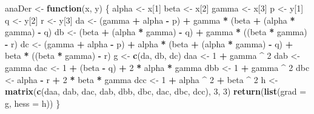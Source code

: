 \documentclass[
  12pt,
]{article}
\newenvironment{Shaded}{\begin{snugshade}}{\end{snugshade}}
\newcommand{\AttributeTok}[1]{\textcolor[rgb]{0.13,0.29,0.53}{#1}}
\newcommand{\ControlFlowTok}[1]{\textcolor[rgb]{0.13,0.29,0.53}{\textbf{#1}}}
\newcommand{\DecValTok}[1]{\textcolor[rgb]{0.00,0.00,0.81}{#1}}
\newcommand{\FunctionTok}[1]{\textcolor[rgb]{0.13,0.29,0.53}{\textbf{#1}}}
\newcommand{\NormalTok}[1]{#1}
\newcommand{\OtherTok}[1]{\textcolor[rgb]{0.56,0.35,0.01}{#1}}
\newcommand{\SpecialCharTok}[1]{\textcolor[rgb]{0.81,0.36,0.00}{\textbf{#1}}}
\begin{document}
\begin{Shaded}
\begin{Highlighting}[]
\NormalTok{anaDer }\OtherTok{\textless{}{-}} \ControlFlowTok{function}\NormalTok{(x, y) \{}
\NormalTok{  alpha }\OtherTok{\textless{}{-}}\NormalTok{ x[}\DecValTok{1}\NormalTok{]}
\NormalTok{  beta }\OtherTok{\textless{}{-}}\NormalTok{ x[}\DecValTok{2}\NormalTok{]}
\NormalTok{  gamma }\OtherTok{\textless{}{-}}\NormalTok{ x[}\DecValTok{3}\NormalTok{]}
\NormalTok{  p }\OtherTok{\textless{}{-}}\NormalTok{ y[}\DecValTok{1}\NormalTok{]}
\NormalTok{  q }\OtherTok{\textless{}{-}}\NormalTok{ y[}\DecValTok{2}\NormalTok{]}
\NormalTok{  r }\OtherTok{\textless{}{-}}\NormalTok{ y[}\DecValTok{3}\NormalTok{]}
\NormalTok{  da }\OtherTok{\textless{}{-}}\NormalTok{ (gamma }\SpecialCharTok{+}\NormalTok{ alpha }\SpecialCharTok{{-}}\NormalTok{ p) }\SpecialCharTok{+}\NormalTok{ gamma }\SpecialCharTok{*}\NormalTok{ (beta }\SpecialCharTok{+}\NormalTok{ (alpha }\SpecialCharTok{*}\NormalTok{ gamma) }\SpecialCharTok{{-}}\NormalTok{ q)}
\NormalTok{  db }\OtherTok{\textless{}{-}}\NormalTok{ (beta }\SpecialCharTok{+}\NormalTok{ (alpha }\SpecialCharTok{*}\NormalTok{ gamma) }\SpecialCharTok{{-}}\NormalTok{ q) }\SpecialCharTok{+}\NormalTok{ gamma }\SpecialCharTok{*}\NormalTok{ ((beta }\SpecialCharTok{*}\NormalTok{ gamma) }\SpecialCharTok{{-}}\NormalTok{ r)}
\NormalTok{  dc }\OtherTok{\textless{}{-}}
\NormalTok{    (gamma }\SpecialCharTok{+}\NormalTok{ alpha }\SpecialCharTok{{-}}\NormalTok{ p) }\SpecialCharTok{+}\NormalTok{ alpha }\SpecialCharTok{*}\NormalTok{ (beta }\SpecialCharTok{+}\NormalTok{ (alpha }\SpecialCharTok{*}\NormalTok{ gamma) }\SpecialCharTok{{-}}\NormalTok{ q) }\SpecialCharTok{+}\NormalTok{ beta }\SpecialCharTok{*}\NormalTok{ ((beta }\SpecialCharTok{*}\NormalTok{ gamma) }\SpecialCharTok{{-}}\NormalTok{ r)}
\NormalTok{  g }\OtherTok{\textless{}{-}} \FunctionTok{c}\NormalTok{(da, db, dc)}
\NormalTok{  daa }\OtherTok{\textless{}{-}} \DecValTok{1} \SpecialCharTok{+}\NormalTok{ gamma }\SpecialCharTok{\^{}} \DecValTok{2}
\NormalTok{  dab }\OtherTok{\textless{}{-}}\NormalTok{ gamma}
\NormalTok{  dac }\OtherTok{\textless{}{-}} \DecValTok{1} \SpecialCharTok{+}\NormalTok{ (beta }\SpecialCharTok{{-}}\NormalTok{ q) }\SpecialCharTok{+} \DecValTok{2} \SpecialCharTok{*}\NormalTok{ alpha }\SpecialCharTok{*}\NormalTok{ gamma}
\NormalTok{  dbb }\OtherTok{\textless{}{-}} \DecValTok{1} \SpecialCharTok{+}\NormalTok{ gamma }\SpecialCharTok{\^{}} \DecValTok{2}
\NormalTok{  dbc }\OtherTok{\textless{}{-}}\NormalTok{ alpha }\SpecialCharTok{{-}}\NormalTok{ r }\SpecialCharTok{+} \DecValTok{2} \SpecialCharTok{*}\NormalTok{ beta }\SpecialCharTok{*}\NormalTok{ gamma}
\NormalTok{  dcc }\OtherTok{\textless{}{-}} \DecValTok{1} \SpecialCharTok{+}\NormalTok{ alpha }\SpecialCharTok{\^{}} \DecValTok{2} \SpecialCharTok{+}\NormalTok{ beta }\SpecialCharTok{\^{}} \DecValTok{2}
\NormalTok{  h }\OtherTok{\textless{}{-}} \FunctionTok{matrix}\NormalTok{(}\FunctionTok{c}\NormalTok{(daa, dab, dac, dab, dbb, dbc, dac, dbc, dcc), }\DecValTok{3}\NormalTok{, }\DecValTok{3}\NormalTok{)}
  \FunctionTok{return}\NormalTok{(}\FunctionTok{list}\NormalTok{(}\AttributeTok{grad =}\NormalTok{ g, }\AttributeTok{hess =}\NormalTok{ h))}
\NormalTok{\}}


\end{Highlighting}
\end{Shaded}
\end{document}
